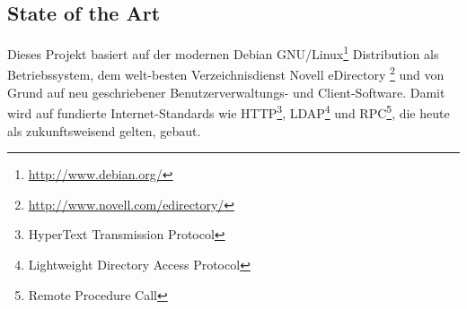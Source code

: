 \subsection{State of the Art}
Dieses Projekt basiert auf der modernen Debian GNU/Linux\footnote{\url{http://www.debian.org/} } Distribution als Betriebssystem, dem welt-besten Verzeichnisdienst Novell eDirectory \footnote{\url{http://www.novell.com/edirectory/} } und von Grund auf neu geschriebener Benutzerverwaltungs- und Client-Software. 
Damit wird auf fundierte Internet-Standards wie HTTP\footnote{HyperText Transmission Protocol}, LDAP\footnote{Lightweight Directory Access Protocol} und RPC\footnote{Remote Procedure Call}, die heute als zukunftsweisend gelten, gebaut.


